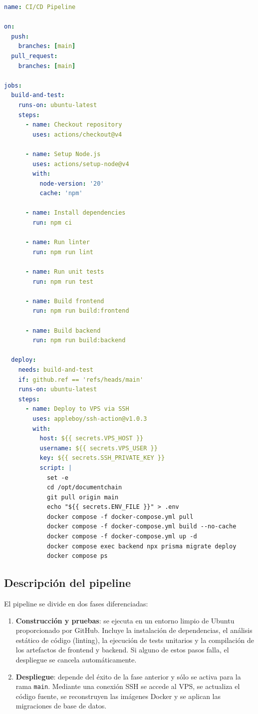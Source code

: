 \documentclass[11pt, a4paper]{article}
\begin{document}
\begin{lstlisting}[language=yaml, caption={Pipeline de despliegue continuo (deploy.yml)}]
name: CI/CD Pipeline

on:
  push:
    branches: [main]
  pull_request:
    branches: [main]

jobs:
  build-and-test:
    runs-on: ubuntu-latest
    steps:
      - name: Checkout repository
        uses: actions/checkout@v4

      - name: Setup Node.js
        uses: actions/setup-node@v4
        with:
          node-version: '20'
          cache: 'npm'

      - name: Install dependencies
        run: npm ci

      - name: Run linter
        run: npm run lint

      - name: Run unit tests
        run: npm run test

      - name: Build frontend
        run: npm run build:frontend

      - name: Build backend
        run: npm run build:backend

  deploy:
    needs: build-and-test
    if: github.ref == 'refs/heads/main'
    runs-on: ubuntu-latest
    steps:
      - name: Deploy to VPS via SSH
        uses: appleboy/ssh-action@v1.0.3
        with:
          host: ${{ secrets.VPS_HOST }}
          username: ${{ secrets.VPS_USER }}
          key: ${{ secrets.SSH_PRIVATE_KEY }}
          script: |
            set -e
            cd /opt/documentchain
            git pull origin main
            echo "${{ secrets.ENV_FILE }}" > .env
            docker compose -f docker-compose.yml pull
            docker compose -f docker-compose.yml build --no-cache
            docker compose -f docker-compose.yml up -d
            docker compose exec backend npx prisma migrate deploy
            docker compose ps
\end{lstlisting}

\subsection{Descripci\'{o}n del pipeline}

El pipeline se divide en dos fases diferenciadas:

\begin{enumerate}[leftmargin=*]
    \item \textbf{Construcci\'{o}n y pruebas}: se ejecuta en un entorno limpio de Ubuntu proporcionado por GitHub. Incluye la instalaci\'{o}n de dependencias, el an\'{a}lisis est\'{a}tico de c\'{o}digo (linting), la ejecuci\'{o}n de tests unitarios y la compilaci\'{o}n de los artefactos de frontend y backend. Si alguno de estos pasos falla, el despliegue se cancela autom\'{a}ticamente.
    \item \textbf{Despliegue}: depende del \'{e}xito de la fase anterior y s\'{o}lo se activa para la rama \texttt{main}. Mediante una conexi\'{o}n SSH se accede al VPS, se actualiza el c\'{o}digo fuente, se reconstruyen las im\'{a}genes Docker y se aplican las migraciones de base de datos.
\end{enumerate}
\end{document}
